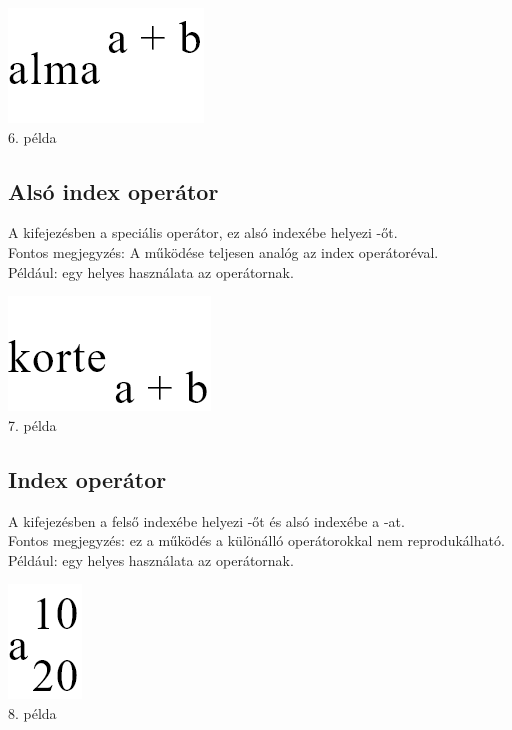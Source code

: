 \documentclass[../spec.tex]{subfiles}
\begin{document}
    \begin{center}
        \includegraphics[scale=0.4]{./images/doc6.png}\\
        6. példa
    \end{center}

    \subsection{Alsó index operátor}\label{subsec:subscript-op}
    A \lang{[kif1]\_ [kif2]} kifejezésben a speciális \lang{\_ } operátor, ez \lang{[kif1]} alsó indexébe helyezi -őt.\\
    Fontos megjegyzés: A működése teljesen analóg az index operátoréval.\\
    Például:  egy helyes használata az operátornak.

    \begin{center}
        \includegraphics[scale=0.4]{./images/doc7.png}\\
        7. példa
    \end{center}

    \subsection{Index operátor}\label{subsec:index-op}
    A  kifejezésben a \lang{[kif1]} felső indexébe helyezi -őt és alsó indexébe a -at.\\
    Fontos megjegyzés: ez a működés a különálló \lang{\tc, \_} operátorokkal nem reprodukálható.
    Például:  egy helyes használata az operátornak.

    \begin{center}
        \includegraphics[scale=0.4]{./images/doc8.png}\\
        8. példa
    \end{center}
\end{document}
